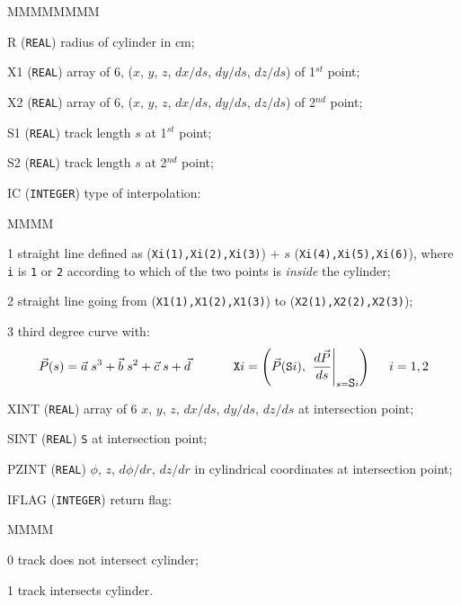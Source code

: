    
   


\begin{DLtt}{MMMMMMMM}
\item[R] ({\tt REAL}) radius of cylinder in cm;
\item[X1] ({\tt REAL}) array of 6, ($x$, $y$, $z$, $dx/ds$, 
$dy/ds$, $dz/ds$) of 1$^{st}$ point;
\item[X2] ({\tt REAL}) array of 6, ($x$, $y$, $z$, $dx/ds$, 
$dy/ds$, $dz/ds$) of 2$^{nd}$ point;
\item[S1] ({\tt REAL}) track length $s$ at 1$^{st}$ point;
\item[S2] ({\tt REAL}) track length $s$ at 2$^{nd}$ point;
\item[IC] ({\tt INTEGER}) type of interpolation:
\begin{DLtt}{MMMM}
\item[1] straight line defined as ({\tt Xi(1),Xi(2),Xi(3)}) + $s$
({\tt Xi(4),Xi(5),Xi(6)}), where {\tt i} is {\tt 1} or {\tt 2} according
to which of the two points is {\it inside} the cylinder;
\item[2] straight line going from ({\tt X1(1),X1(2),X1(3)}) to
({\tt X2(1),X2(2),X2(3)});
\item[3] third degree curve with:
\[
\vec{P}(s)  =  \vec{a} \; s^3 + \vec{b} \; s^2 +\vec{c} \; s +\vec{d} 
\hspace{1.2cm}
\mbox{\tt X}i   =  \left ( \vec{P}(\mbox{\tt S}i), \; 
\left . \frac{d\vec{P}}{ds} \right |_{s=\mbox{\tt S}i} \right ) \hspace{5mm}
i=1,2
\]
\end{DLtt}
\item[XINT] ({\tt REAL}) array of 6 $x$, $y$, $z$, $dx/ds$, $dy/ds$, $dz/ds$ 
at intersection point;
\item[SINT] ({\tt REAL}) {\tt S} at intersection point;
\item[PZINT] ({\tt REAL}) $\phi$, $z$, $d\phi/dr$, $dz/dr$ in
cylindrical coordinates at intersection point;
\item[IFLAG] ({\tt INTEGER}) return flag:
\begin{DLtt}{MMMM}
\item[0] track does not intersect cylinder;
\item[1] track intersects cylinder.
\end{DLtt}
\end{DLtt}
